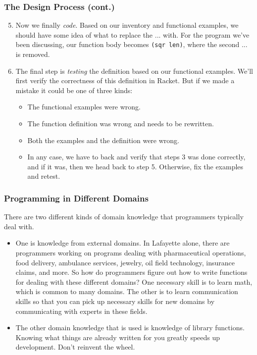 \documentclass{beamer}
\begin{document}
\begin{frame}
  \frametitle{The Design Process (cont.)}
  \begin{enumerate}
    \setcounter{enumi}{4}
  \item<2-> Now we finally \emph{code}. Based on our inventory and functional examples, we should have some idea of what to replace the ... with.
    For the program we've been discussing, our function body becomes \texttt{(sqr len)}, where the second ... is removed.
  \item<3-> The final step is \emph{testing} the definition based on our functional examples.
    We'll first verify the correctness of this definition in Racket. But if we made a mistake it could be one of three kinds:
    \begin{itemize}
    \item<4-> The functional examples were wrong.
    \item<5-> The function definition was wrong and needs to be rewritten.
    \item<6-> Both the examples and the definition were wrong.
    \item<7-> In any case, we have to back and verify that steps 3 was done correctly, and if it was, then we head back to step 5. Otherwise, fix the examples and retest.
    \end{itemize}    
  \end{enumerate}
\end{frame}    


\begin{frame}
  \frametitle{Programming in Different Domains}
  There are two different kinds of domain knowledge that programmers typically deal with.
  \begin{itemize}
  \item<2-> One is knowledge from external domains. In Lafayette alone, there are programmers working on programs dealing with pharmaceutical operations, food  delivery, ambulance services, jewelry, oil field technology, insurance claims, and more. So  how do programmers figure out how to write functions
    for dealing with these different domains? One necessary skill is to learn math, which is common to many domains. The other is to learn communication skills so that you can pick up necessary skills for new domains by communicating with experts in these fields.
  \item<3-> The other domain knowledge that is used is knowledge of library functions. Knowing what things are already written for you greatly speeds up development.
    Don't reinvent the wheel.
  \end{itemize}  
\end{frame}
\end{document}
